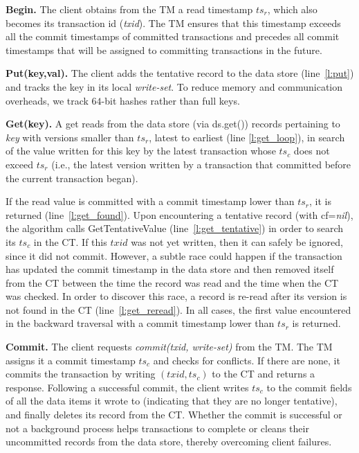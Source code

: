 {\bf Begin.} The client obtains from the TM a read timestamp $ts_r$, 
which also becomes its transaction id ({\em txid}). 
The TM ensures that this timestamp exceeds all the commit timestamps of committed transactions
and precedes all commit timestamps that will be assigned to  committing transactions in the future.

{\bf Put(key,val).} 
The client adds  the tentative record 
to the data store (line~\ref{l:put}) and tracks the key in its local \emph{write-set}.
 To reduce  memory and communication overheads, we track $64$-bit hashes rather than  full keys. 

{\bf Get(key).} A get 
reads from the data store (via ds.get()) records pertaining to \emph{key} with versions smaller than $ts_r$, latest to earliest
(line \ref{l:get_loop}),
in search of the value written for this key by the latest transaction whose $ts_c$ does not exceed $ts_r$ (i.e., the latest version written by a transaction that committed before the current transaction began).

If the read value is committed with a commit timestamp lower than $ts_r$, it is returned (line~\ref{l:get_found}).
Upon encountering a tentative record (with cf=\emph{nil}), the algorithm calls {\sc GetTentativeValue} (line~\ref{l:get_tentative}) 
in order to search its $ts_c$ in the CT. 
If this $txid$ was not yet written, %
then it can safely be ignored, since it did not commit. However, 
a subtle race could happen if the transaction has updated the commit timestamp 
in the data store and then removed itself from the CT between the time the record was read and the time when the CT was checked.
In order to discover this race, a record is re-read after its version is not found in the CT (line~\ref{l:get_reread}).
In all cases, the first value encountered in the backward traversal
with a commit timestamp lower than $ts_r$ is returned.

{\bf Commit.} The client requests \emph{commit(txid, write-set)} from the TM.
The TM assigns it a commit timestamp $ts_c$ and checks for conflicts. If there are none, it commits the transaction by writing  $(txid, ts_c)$ to the CT and returns a response. Following a successful commit,
the client writes  $ts_c$ to 
the commit fields of all the data items it wrote to (indicating that they are no longer tentative), and finally 
deletes its record from the CT.
Whether the commit is successful or not 
a background process helps transactions to complete or cleans their uncommitted records from the data store, thereby overcoming client failures.

